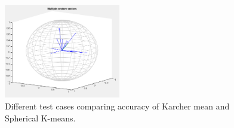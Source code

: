 \documentclass[../tech_report_1.tex]{subfiles}
\begin{document}
\begin{figure}[ht]
\begin{centering}
\includegraphics[width=2in]{fig5.png}
\par\end{centering}

\caption{Different test cases comparing accuracy of Karcher mean and Spherical
K-means.\label{fig:Different-test-cases}}


\end{figure}
\end{document}
